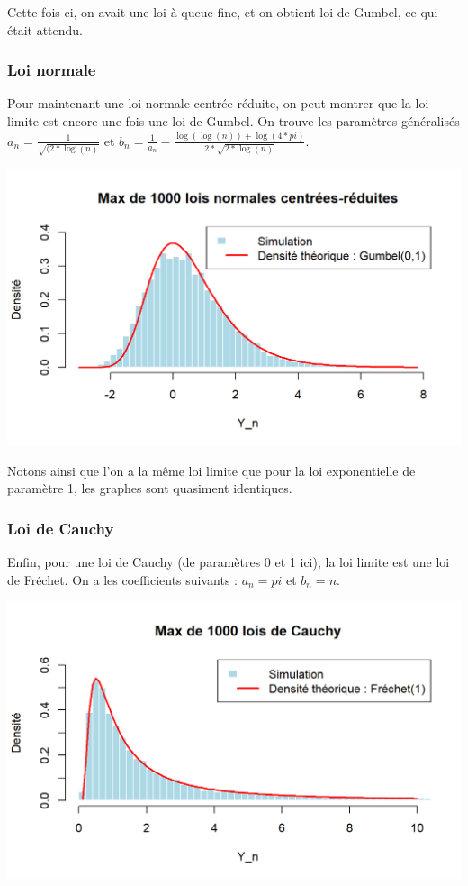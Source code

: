 \documentclass{article}
\begin{document}
\noindent Cette fois-ci, on avait une loi à queue fine, et on obtient loi de Gumbel, ce qui était attendu.

\subsubsection{Loi normale}

\noindent Pour maintenant une loi normale centrée-réduite, on peut montrer que la loi limite est encore une fois une loi de Gumbel. On trouve les paramètres généralisés $a_n = \frac{1}{\sqrt{(2*\log(n)}} $ et $b_n = \frac{1}{a_n} - \frac{\log(\log(n)) + \log(4 * pi)}{2 * \sqrt{2 * \log(n)}} $.

\begin{center}
	\includegraphics[scale=0.8]{./Codes_R/Max_Normale.png} 
\end{center}

\noindent Notons ainsi que l'on a la même loi limite que pour la loi exponentielle de paramètre 1, les graphes sont quasiment identiques.

\subsubsection{Loi de Cauchy}

\noindent Enfin, pour une loi de Cauchy (de paramètres 0 et 1 ici), la loi limite est une loi de Fréchet. On a les coefficients suivants : $a_n = pi $ et $b_n = n $.

\begin{center}
	\includegraphics[scale=0.8]{./Codes_R/Max_Cauchy.png} 
\end{center}
\end{document}

